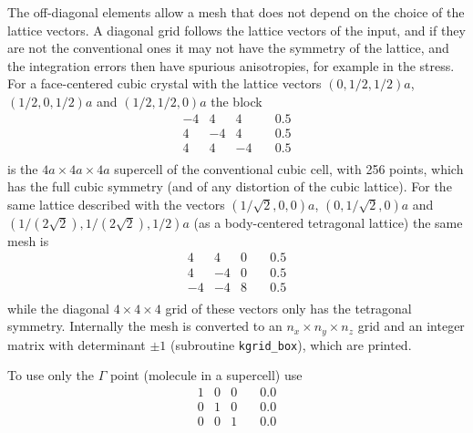 \documentclass[11pt]{article}
\begin{document}
\begin{itemize}
  The off-diagonal elements allow a mesh that does not depend on the choice
  of the lattice vectors.  A diagonal grid follows the lattice vectors of the input,
  and if they are not the conventional ones it may not have the symmetry of the lattice,
  and the integration errors then have spurious anisotropies, for example in the stress.
  For a face-centered cubic crystal with the lattice vectors
  $(0,1/2,1/2)a$, $(1/2,0,1/2)a$ and $(1/2,1/2,0)a$ the block
  \begin{equation*}
      \begin{matrix}
       -4  &  4  &  4  & \quad  0.5 \\
        4  & -4  &  4  & \quad  0.5 \\
        4  &  4  & -4  & \quad  0.5 \\
      \end{matrix}
  \end{equation*}
  is the $4a \times 4a \times 4a$ supercell of the conventional cubic cell, with 256 points,
  which has the full cubic symmetry (and of any distortion of the cubic lattice).
  For the same lattice described with the vectors
  $(1/\sqrt{2},0,0)a$, $(0,1/\sqrt{2},0)a$ and $(1/(2\sqrt{2}),1/(2\sqrt{2}),1/2)a$
  (as a body-centered tetragonal lattice) the same mesh is
  \begin{equation*}
      \begin{matrix}
        4  &  4  &  0  & \quad  0.5 \\
        4  & -4  &  0  & \quad  0.5 \\
       -4  & -4  &  8  & \quad  0.5 \\
      \end{matrix}
  \end{equation*}
  while the diagonal $4\times4\times4$ grid of these vectors only has the tetragonal symmetry.
  Internally the mesh is converted to an $n_x \times n_y \times n_z$ grid and an
  integer matrix with determinant $\pm 1$ (subroutine \texttt{kgrid\_box}), which are printed.

  To use only the $\Gamma$ point (molecule in a supercell) use
  \begin{equation*}
      \begin{matrix}
        1  &  0  &  0  & \quad  0.0 \\
        0  &  1  &  0  & \quad  0.0 \\
        0  &  0  &  1  & \quad  0.0 \\
      \end{matrix}
  \end{equation*}


\end{itemize}
\end{document}
